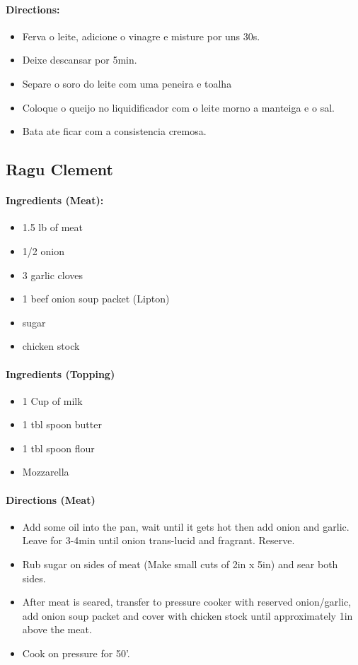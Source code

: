 \documentclass{article}
\begin{document}
\paragraph{Directions:}
\begin{itemize}
	\item Ferva o leite, adicione o vinagre e misture por uns 30s.
	\item Deixe descansar por 5min.
	\item Separe o soro do leite com uma peneira e toalha
	\item Coloque o queijo no liquidificador com o leite morno a manteiga e o sal.
	\item Bata ate ficar com a consistencia cremosa.
\end{itemize}

\subsection{Ragu Clement}

\paragraph{Ingredients (Meat):}
\begin{itemize}
	\item 1.5 lb of meat
	\item 1/2 onion
	\item 3 garlic cloves
	\item 1 beef onion soup packet (Lipton)
	\item sugar
	\item chicken stock
\end{itemize}

\paragraph{Ingredients (Topping)}
\begin{itemize}
	\item 1 Cup of milk
	\item 1 tbl spoon butter
	\item 1 tbl spoon flour
	\item Mozzarella
\end{itemize}

\paragraph{Directions (Meat)}
\begin{itemize}
	\item Add some oil into the pan, wait until it gets hot then add onion and garlic. Leave for 3-4min until onion trans-lucid and fragrant. Reserve.
	\item Rub sugar on sides of meat (Make small cuts of 2in x 5in) and sear both sides.
	\item After meat is seared, transfer to pressure cooker with reserved onion/garlic, add onion soup packet and cover with chicken stock until approximately 1in above the meat.
	\item Cook on pressure for 50'.
\end{itemize}
\end{document}
